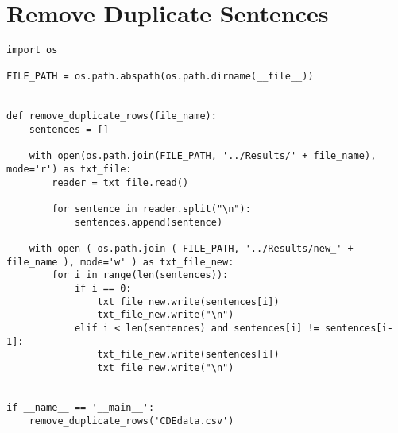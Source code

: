 
\chapter{Remove Duplicate Sentences}

\label{Appendix2}

\begin{lstlisting}[language=iPython]
import os

FILE_PATH = os.path.abspath(os.path.dirname(__file__))


def remove_duplicate_rows(file_name):
	sentences = []
	
	with open(os.path.join(FILE_PATH, '../Results/' + file_name), mode='r') as txt_file:
		reader = txt_file.read()
		
		for sentence in reader.split("\n"):
			sentences.append(sentence)
	
	with open ( os.path.join ( FILE_PATH, '../Results/new_' + file_name ), mode='w' ) as txt_file_new:
		for i in range(len(sentences)):
			if i == 0:
				txt_file_new.write(sentences[i])
				txt_file_new.write("\n")
			elif i < len(sentences) and sentences[i] != sentences[i-1]:
				txt_file_new.write(sentences[i])
				txt_file_new.write("\n")


if __name__ == '__main__':
	remove_duplicate_rows('CDEdata.csv')
	
\end{lstlisting}
